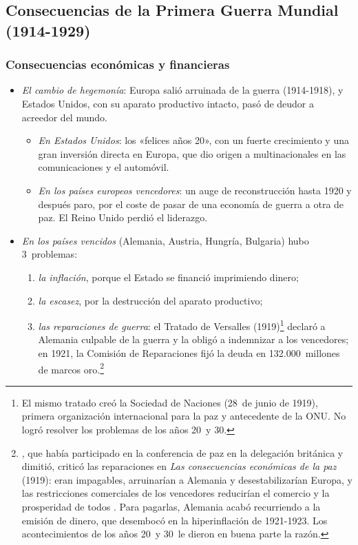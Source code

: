 \documentclass[11pt]{article}
\begin{document}
\subsection{Consecuencias de la Primera Guerra Mundial\cortetitulo{} (1914-1929)}\label{sec:primera-guerra}

\subsubsection{Consecuencias económicas y financieras}

\begin{itemize}
\item \emph{El cambio de hegemonía}: Europa salió arruinada de la guerra (1914-1918), y Estados Unidos, con su aparato productivo intacto, pasó de deudor a acreedor del mundo.
  \begin{itemize}
  \item \emph{En Estados Unidos}: los «felices años 20», con un fuerte crecimiento y una gran inversión directa en Europa, que dio origen a multinacionales en las comunicaciones y el automóvil.
  \item \emph{En los países europeos vencedores}: un auge de reconstrucción hasta 1920 y después paro, por el coste de pasar de una economía de guerra a otra de paz. El Reino Unido perdió el liderazgo.
  \end{itemize}
\item \emph{En los países vencidos} (Alemania, Austria, Hungría, Bulgaria) hubo 3~problemas:
  \begin{enumerate}
  \item \emph{la inflación}, porque el Estado se financió imprimiendo dinero;
  \item \emph{la escasez}, por la destrucción del aparato productivo;
  \item \emph{las reparaciones de guerra}: el Tratado de Versalles (1919)\footnote{El mismo tratado creó la Sociedad de Naciones (28~de junio de 1919), primera organización internacional para la paz y antecedente de la ONU. No logró resolver los problemas de los años 20~y 30.} declaró a Alemania culpable de la guerra y la obligó a indemnizar a los vencedores; en 1921, la Comisión de Reparaciones fijó la deuda en 132.000~millones de marcos oro.\footnote{, que había participado en la conferencia de paz en la delegación británica y dimitió, criticó las reparaciones en \emph{Las consecuencias económicas de la paz} (1919): eran impagables, arruinarían a Alemania y desestabilizarían Europa, y las restricciones comerciales de los vencedores reducirían el comercio y la prosperidad de todos\nocite{Keynes1919Economic} . Para pagarlas, Alemania acabó recurriendo a la emisión de dinero, que desembocó en la hiperinflación de 1921-1923. Los acontecimientos de los años 20~y 30~le dieron en buena parte la razón.}

\end{enumerate}
\end{itemize}
\end{document}
